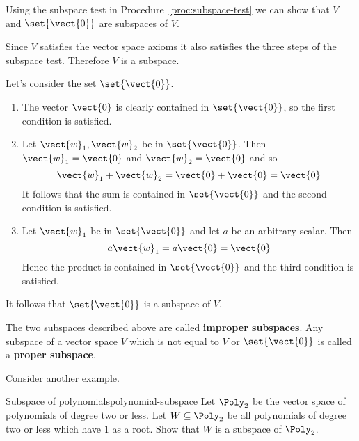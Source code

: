 \begin{solution}
  Using the subspace test in Procedure~\ref{proc:subspace-test} we can
  show that $V$ and $\set{\vect{0} }$ are subspaces of $V$.

  Since $V$ satisfies the vector space axioms it also satisfies the
  three steps of the subspace test. Therefore $V$ is a subspace.

  Let's consider the set $\set{\vect{0} }$.
  \begin{enumerate}
  \item The vector $\vect{0}$ is clearly contained in
    $\set{\vect{0} }$, so the first condition is satisfied.

  \item Let $\vect{w}_1, \vect{w}_2$ be in $\set{\vect{0} }$. Then
    $\vect{w}_1 = \vect{0}$ and $\vect{w}_2 = \vect{0}$ and so
    \begin{equation*}
      \vect{w}_1 + \vect{w}_2 = \vect{0} + \vect{0} = \vect{0}
    \end{equation*}
    It follows that the sum is contained in $\set{\vect{0} }$ and the
    second condition is satisfied.

  \item Let $\vect{w}_1$ be in $\set{\vect{0} }$ and let $a$ be an
    arbitrary scalar. Then
    \begin{equation*}
      a\vect{w}_1  = a\vect{0} = \vect{0}
    \end{equation*}
    Hence the product is contained in $\set{\vect{0} }$ and the third
    condition is satisfied.
  \end{enumerate}

  It follows that $\set{\vect{0} }$ is a subspace of $V$.
\end{solution}

The two subspaces described above are called \textbf{improper
  subspaces}. Any subspace of a vector space
$V$ which is not equal to $V$ or $\set{\vect{0} }$ is called a
\textbf{proper subspace}.

Consider another example.

\begin{example}{Subspace of polynomials}{polynomial-subspace}
  Let $\Poly_2$ be the vector space of polynomials of degree two or
  less. Let $W \subseteq \Poly_2$ be all polynomials of degree two or
  less which have $1$ as a root. Show that $W$ is a subspace of
  $\Poly_2$.
\end{example}

